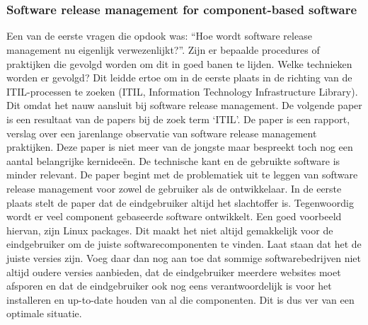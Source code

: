 \chapter{}
\label{ch:stand-van-zaken}


\subsection{Software release management for component-based software}
Een van de eerste vragen die opdook was: “Hoe wordt software release management nu eigenlijk verwezenlijkt?”. Zijn er bepaalde procedures of praktijken die gevolgd worden om dit in goed banen te lijden. Welke technieken worden er gevolgd? Dit leidde ertoe om in de eerste plaats in de richting van de ITIL-processen te zoeken (ITIL, Information Technology Infrastructure Library). Dit omdat het nauw aansluit bij software release management. De volgende paper \autocite{Hoek2002} is een resultaat van de papers bij de zoek term ‘ITIL’.
\newline
\newline
De paper \autocite{Hoek2002} is een rapport, verslag over een jarenlange observatie van software release management praktijken. Deze paper \autocite{Hoek2002} is niet meer van de jongste maar bespreekt toch nog een aantal belangrijke kernideeën. De technische kant en de gebruikte software is minder relevant.
\newline
\newline
De paper \autocite{Hoek2002} begint met de problematiek uit te leggen van software release management voor zowel de gebruiker als de ontwikkelaar. In de eerste plaats stelt de paper dat de eindgebruiker altijd het slachtoffer is. Tegenwoordig wordt er veel component gebaseerde software ontwikkelt. Een goed voorbeeld hiervan, zijn Linux packages. Dit maakt het niet altijd gemakkelijk voor de eindgebruiker om de juiste softwarecomponenten te vinden. Laat staan dat het de juiste versies zijn. Voeg daar dan nog aan toe dat sommige softwarebedrijven niet altijd oudere versies aanbieden, dat de eindgebruiker meerdere websites moet afsporen en dat de eindgebruiker ook nog eens verantwoordelijk is voor het installeren en up-to-date houden van al die componenten. Dit is dus ver van een optimale situatie.
